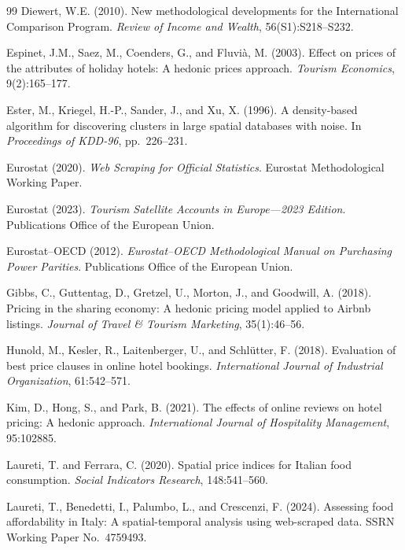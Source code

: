 \documentclass[12pt,a4paper]{article}
\begin{document}
\begin{thebibliography}{99}
Diewert, W.E. (2010).
New methodological developments for the International Comparison Program.
\textit{Review of Income and Wealth}, 56(S1):S218--S232.

Espinet, J.M., Saez, M., Coenders, G., and Fluvi\`a, M. (2003).
Effect on prices of the attributes of holiday hotels: A hedonic prices approach.
\textit{Tourism Economics}, 9(2):165--177.

Ester, M., Kriegel, H.-P., Sander, J., and Xu, X. (1996).
A density-based algorithm for discovering clusters in large spatial databases with noise.
In \textit{Proceedings of KDD-96}, pp.\ 226--231.

Eurostat (2020).
\textit{Web Scraping for Official Statistics}.
Eurostat Methodological Working Paper.

Eurostat (2023).
\textit{Tourism Satellite Accounts in Europe---2023 Edition}.
Publications Office of the European Union.

Eurostat--OECD (2012).
\textit{Eurostat--OECD Methodological Manual on Purchasing Power Parities}.
Publications Office of the European Union.

Gibbs, C., Guttentag, D., Gretzel, U., Morton, J., and Goodwill, A. (2018).
Pricing in the sharing economy: A hedonic pricing model applied to Airbnb listings.
\textit{Journal of Travel \& Tourism Marketing}, 35(1):46--56.

Hunold, M., Kesler, R., Laitenberger, U., and Schlütter, F. (2018).
Evaluation of best price clauses in online hotel bookings.
\textit{International Journal of Industrial Organization}, 61:542--571.

Kim, D., Hong, S., and Park, B. (2021).
The effects of online reviews on hotel pricing: A hedonic approach.
\textit{International Journal of Hospitality Management}, 95:102885.

Laureti, T. and Ferrara, C. (2020).
Spatial price indices for Italian food consumption.
\textit{Social Indicators Research}, 148:541--560.

Laureti, T., Benedetti, I., Palumbo, L., and Crescenzi, F. (2024).
Assessing food affordability in Italy: A spatial-temporal analysis using web-scraped data.
SSRN Working Paper No.\ 4759493.


\end{thebibliography}
\end{document}
